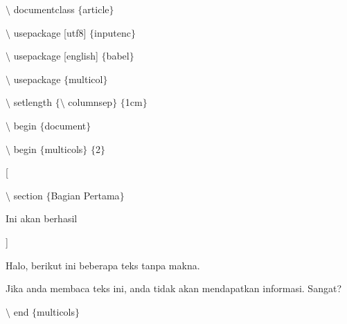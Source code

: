 \begin{itemize}
\hspace*{0.5in}$\setminus$ documentclass $ \{ $article$ \} $\par

\hspace*{0.5in}$\setminus$ usepackage [utf8] $ \{ $inputenc$ \} $\par

\hspace*{0.5in}$\setminus$ usepackage [english] $ \{ $babel$ \} $\par

\hspace*{0.5in}$\setminus$ usepackage $ \{ $multicol$ \} $\par

\hspace*{0.5in}$\setminus$ setlength $ \{ $$\setminus$ columnsep$ \} $ $ \{ $1cm$ \} $\par

\hspace*{0.5in}$\setminus$ begin $ \{ $document$ \} $\par

\hspace*{0.5in}$\setminus$ begin $ \{ $multicols$ \} $ $ \{ $2$ \} $\par

\hspace*{0.5in}[\par

\hspace*{0.5in}\hspace*{0.5in}$\setminus$ section $ \{ $Bagian Pertama$ \} $\par

\hspace*{0.5in}\hspace*{0.5in}Ini akan berhasil \par

\hspace*{0.5in}]\par

\hspace*{0.5in}\hspace*{0.5in}Halo, berikut ini beberapa teks tanpa makna. \par

\hspace*{0.5in}\hspace*{0.5in}Jika anda membaca teks ini, anda tidak akan mendapatkan informasi. Sangat?\par

\hspace*{0.5in}$\setminus$ end $ \{ $multicols$ \} $\par


\end{itemize}
